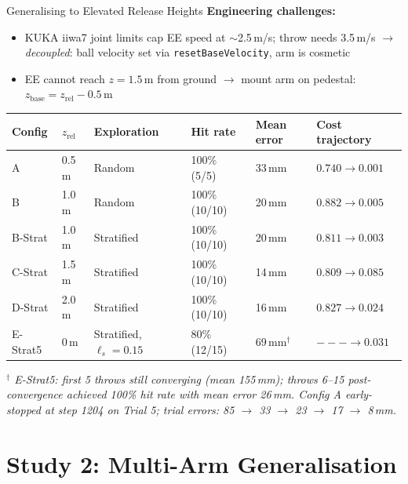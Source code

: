 \documentclass{if-beamer}
\begin{document}
\begin{frame}{Generalising to Elevated Release Heights}
    \textbf{Engineering challenges:}
    \begin{itemize}
        \item KUKA iiwa7 joint limits cap EE speed at $\sim$2.5\,m/s; throw needs 3.5\,m/s $\rightarrow$ \textit{decoupled}: ball velocity set via \texttt{resetBaseVelocity}, arm is cosmetic
        \item EE cannot reach $z=1.5$\,m from ground $\rightarrow$ mount arm on pedestal: $z_\text{base} = z_\text{rel} - 0.5$\,m
    \end{itemize}
    \vspace{0.5em}
    \begin{center}
    \scriptsize
    \begin{tabular}{llllll}
        \toprule
        \textbf{Config} & \textbf{$z_\text{rel}$} & \textbf{Exploration} & \textbf{Hit rate} & \textbf{Mean error} & \textbf{Cost trajectory} \\
        \midrule
        A        & 0.5\,m & Random & 100\% (5/5) & 33\,mm & $0.740 \rightarrow 0.001$ \\
        B        & 1.0\,m & Random & 100\% (10/10) & 20\,mm & $0.882 \rightarrow 0.005$ \\
        B-Strat  & 1.0\,m & Stratified & 100\% (10/10) & 20\,mm & $0.811 \rightarrow 0.003$ \\
        C-Strat  & 1.5\,m & Stratified & 100\% (10/10) & 14\,mm & $0.809 \rightarrow 0.085$ \\
        D-Strat  & 2.0\,m & Stratified & 100\% (10/10) & 16\,mm & $0.827 \rightarrow 0.024$ \\
        E-Strat5 & 0\,m & Stratified, $\ell_s=0.15$ & 80\% (12/15) & 69\,mm$^\dagger$ & $--- \rightarrow 0.031$ \\
        \bottomrule
    \end{tabular}
    \end{center}
    \vspace{0.3em}
    \textit{$^\dagger$ E-Strat5: first 5 throws still converging (mean 155\,mm); throws 6--15 post-convergence achieved 100\% hit rate with mean error 26\,mm. Config A early-stopped at step 1204 on Trial 5; trial errors: 85 $\rightarrow$ 33 $\rightarrow$ 23 $\rightarrow$ 17 $\rightarrow$ 8\,mm.}
\end{frame}

\section{Study 2: Multi-Arm Generalisation}
\end{document}
